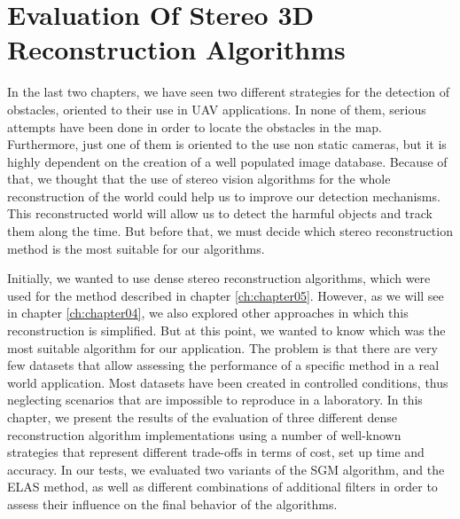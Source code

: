\graphicspath{{./images/chapter03/bmps/}{./images/chapter03/vects/}{./images/chapter03/}}

\chapter{Evaluation Of Stereo 3D Reconstruction Algorithms}\label{ch:chapter03}

In the last two chapters, we have seen two different strategies for the detection of obstacles, oriented to their use in \ac{UAV} applications. In none of them, serious attempts have been done in order to locate the obstacles in the map. Furthermore, just one of them is oriented to the use non static cameras, but it is highly dependent on the creation of a well populated image database. Because of that, we thought that the use of stereo vision algorithms for the whole reconstruction of the world could help us to improve our detection mechanisms. This reconstructed world will allow us to detect the harmful objects and track them along the time. But before that, we must decide which stereo reconstruction method is the most suitable for our algorithms. 

Initially, we wanted to use dense stereo reconstruction algorithms, which were used for the method described in chapter \ref{ch:chapter05}. However, as we will see in chapter \ref{ch:chapter04}, we also explored other approaches in which this reconstruction is simplified. But at this point, we wanted to know which was the most suitable algorithm for our application. The problem is that there are very few datasets that allow assessing the performance of a specific method in a real world application. Most datasets have been created in controlled conditions, thus neglecting scenarios that are impossible to reproduce in a laboratory. In this chapter, we present the results of the evaluation of three different dense reconstruction algorithm implementations using a number of well-known strategies that represent different trade-offs in terms of cost, set up time and accuracy. In our tests, we evaluated two variants of the \acf{SGM} algorithm, and the \acf{ELAS} method, as well as different combinations of additional filters in order to assess their influence on the final behavior of the algorithms.

